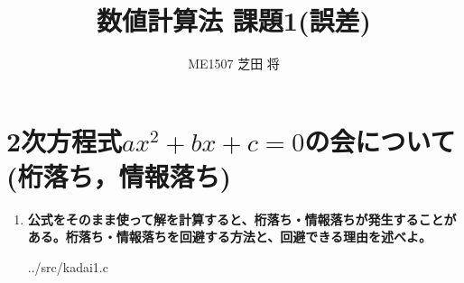 \documentclass[titlepage]{jsarticle}
\title{\LARGE {数値計算法 課題1(誤差)}}
\author{\large {ME1507 芝田 将}}
\begin{document}
\maketitle

\section{2次方程式$ax^{2}+bx+c=0$の会について(桁落ち，情報落ち)}

\begin{enumerate}
\item \textbf{公式をそのまま使って解を計算すると、桁落ち・情報落ちが発生することがある。桁落ち・情報落ちを回避する方法と、回避できる理由を述べよ。}




{../src/kadai1.c}


\end{enumerate}
\end{document}
